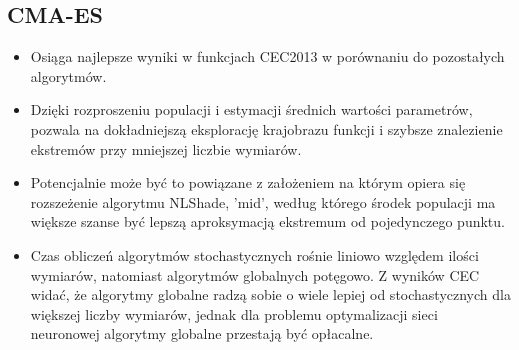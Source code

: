 
\subsection*{CMA-ES}
\begin{itemize}
    \item Osiąga najlepsze wyniki w funkcjach CEC2013 w porównaniu do pozostałych algorytmów.

    \item Dzięki rozproszeniu populacji i estymacji średnich wartości parametrów, pozwala na dokładniejszą eksplorację krajobrazu funkcji i szybsze znalezienie ekstremów przy mniejszej liczbie wymiarów.

    \item Potencjalnie może być to powiązane z założeniem na którym opiera się rozszeżenie algorytmu NLShade, 'mid', według którego środek populacji ma większe szanse być lepszą aproksymacją ekstremum od pojedynczego punktu.

    \item Czas obliczeń algorytmów stochastycznych rośnie liniowo względem ilości wymiarów, natomiast algorytmów globalnych potęgowo. Z wyników CEC widać, że algorytmy globalne radzą sobie o wiele lepiej od stochastycznych dla większej liczby wymiarów, jednak dla problemu optymalizacji sieci neuronowej algorytmy globalne przestają być opłacalne.
\end{itemize}

